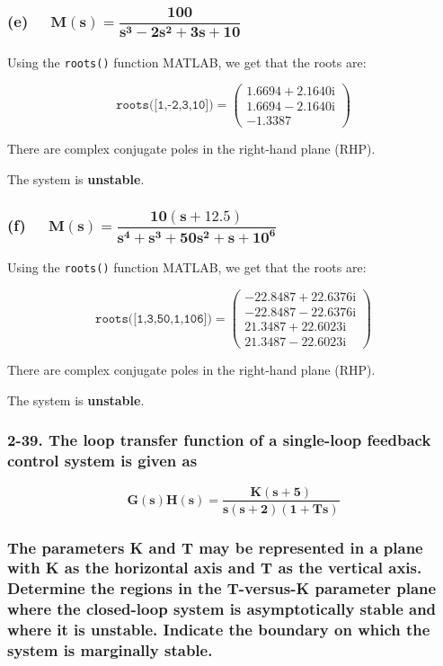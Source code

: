 \documentclass[12pt, letterpaper]{../assignment}
\begin{document}
\subsubsection*{(e) \ \ $ \mathbf{ M(s) = \dfrac{100}{s^3 - 2s^2 + 3s + 10}}$}

Using the \texttt{roots()} function MATLAB, we get that the roots are:

$$ \texttt{roots([1,-2,3,10])} = \left(\begin{array}{c} 1.6694+2.1640{}\mathrm{i}\\ 1.6694-2.1640{}\mathrm{i}\\ -1.3387 \end{array}\right)$$

There are complex conjugate poles in the right-hand plane (RHP).

\begin{answer}
    The system is \textbf{unstable}.
\end{answer}


\subsubsection*{(f) \ \ $ \mathbf{ M(s) = \dfrac{10(s + 12.5)}{s^4 + s^3 + 50s^2 + s + 10^6}}$}

Using the \texttt{roots()} function MATLAB, we get that the roots are:

$$ \texttt{roots([1,3,50,1,10\^{}6])} = \left(\begin{array}{c} -22.8487+22.6376{}\mathrm{i}\\ -22.8487-22.6376{}\mathrm{i}\\ 21.3487+22.6023{}\mathrm{i}\\ 21.3487-22.6023{}\mathrm{i} \end{array}\right)$$

There are complex conjugate poles in the right-hand plane (RHP).

\begin{answer}
The system is \textbf{unstable}.
\end{answer}


\subsubsection*{2-39. The loop transfer function of a single-loop feedback control system is given as}

$$ \mathbf{ G(s)H(s) = \frac{K(s+5)}{s (s+2) (1+ T s)} } $$

\subsubsection*{The parameters K and T may be represented in a plane with K as the horizontal axis and T as the vertical axis. Determine the regions in the T-versus-K parameter plane where the closed-loop system is asymptotically stable and where it is unstable. Indicate the boundary on which the system is marginally stable.}
\end{document}
